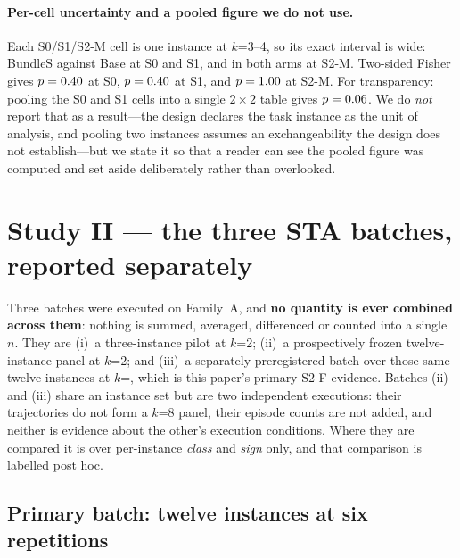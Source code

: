 \documentclass{article}
\begin{document}
\paragraph{Per-cell uncertainty and a pooled figure we do not use.} Each S0/S1/S2-M cell is one instance at $k$=3--4, so its exact interval is wide: BundleS \StatSZeroTreatCI{} against Base \StatSZeroBaseCI{} at S0 and S1, and \StatSTwoMTreatCI{} in both arms at S2-M. Two-sided Fisher gives $p=0.40$ at S0, $p=0.40$ at S1, and $p=1.00$ at S2-M. For transparency: pooling the S0 and S1 cells into a single $2\times2$ table gives $p=0.06$. We do \emph{not} report that as a result---the design declares the task instance as the unit of analysis, and pooling two instances assumes an exchangeability the design does not establish---but we state it so that a reader can see the pooled figure was computed and set aside deliberately rather than overlooked.

\section{Study II --- the three STA batches, reported separately}
\label{app:pilot}
Three batches were executed on Family~A, and \textbf{no quantity is ever combined across them}: nothing is summed, averaged, differenced or counted into a single $n$. They are (i)~a three-instance pilot at $k$=2; (ii)~a prospectively frozen twelve-instance panel at $k$=2; and (iii)~a separately preregistered batch over those same twelve instances at $k$=\StatEightAK{}, which is this paper's primary S2-F evidence. Batches (ii) and (iii) share an instance set but are two independent executions: their trajectories do not form a $k$=8 panel, their episode counts are not added, and neither is evidence about the other's execution conditions. Where they are compared it is over per-instance \emph{class} and \emph{sign} only, and that comparison is labelled post hoc.

\subsection*{Primary batch: twelve instances at six repetitions}

\begin{table}[h]
\centering\footnotesize
\caption{\textbf{Primary S2-F panel}: per-instance outcomes over the twelve prospectively frozen instances at $k$=\StatEightAK{}. Correct-of-$k$ is printed rather than a rate because every cell that is neither 0/6 nor 6/6 is one of the \StatEightAUnstableCells{} cells whose six identical repetitions disagreed with one another; ``inf.''\ marks the \StatEightAInformativeN{} instances able to express a Base-vs-BundleS difference at all. Generated from the frozen report by a committed script, so the table cannot drift from the records by transcription.}
\label{tab:sta12k6}

\end{table}
\end{document}
